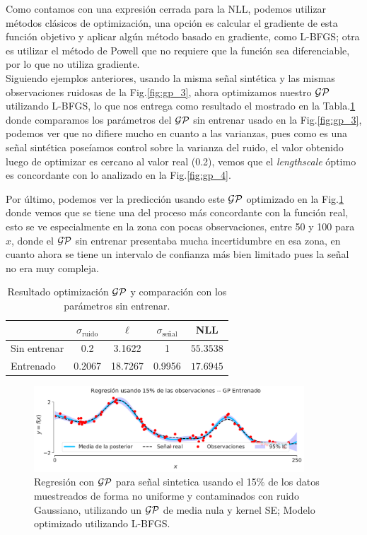 
Como contamos con una expresión cerrada para la NLL, podemos utilizar métodos clásicos de optimización, una opción es calcular el gradiente de esta función objetivo y aplicar algún método basado en gradiente, como L-BFGS; otra es utilizar el método de Powell que no requiere que la función sea diferenciable, por lo que no utiliza gradiente.\\


Siguiendo ejemplos anteriores, usando la misma señal sintética y las mismas observaciones ruidosas de la Fig.\ref{fig:gp_3}, ahora optimizamos nuestro $\mathcal{GP}$ utilizando L-BFGS, lo que nos entrega como resultado el mostrado en la Tabla.\ref{tab:gp_1} donde comparamos los parámetros del $\mathcal{GP}$ sin entrenar usado en la Fig.\ref{fig:gp_3}, podemos ver que no difiere mucho en cuanto a las varianzas, pues como es una señal sintética poseíamos control sobre la varianza del ruido, el valor obtenido luego de optimizar es cercano al valor real (0.2), vemos que el \textit{lengthscale} óptimo es concordante con lo analizado en la Fig.\ref{fig:gp_4}.

Por último, podemos ver la predicción usando este $\mathcal{GP}$ optimizado en la Fig.\ref{fig:gp_5} donde vemos que se tiene una del proceso más concordante con la función real, esto se ve especialmente en la zona con pocas observaciones, entre 50 y 100 para $x$, donde el $\mathcal{GP}$ sin entrenar presentaba mucha incertidumbre en esa zona, en cuanto ahora se tiene un intervalo de confianza más bien limitado pues la señal no era muy compleja.

\begin{table}[H]
\centering
\begin{tabular}{lcccc}
 & $\sigma_{\text{ruido}}$ & $\ell$ & $\sigma_{\text{señal}}$ & NLL\\ \hline
Sin entrenar & 0.2 & 3.1622 & 1 & $\mathbf{55.3538}$\\
Entrenado & 0.2067 & 18.7267 & 0.9956 & $\mathbf{17.6945}$\\
\end{tabular}
\caption{Resultado optimización $\mathcal{GP}$ y comparación con los parámetros sin entrenar.}
\label{tab:gp_1}
\end{table}


\begin{figure}[H]
	\centering
	\includegraphics[width=0.9\textwidth]{img/cap6_gp_entrenado}
	\caption{Regresión con $\mathcal{GP}$ para señal sintetica usando el 15$\%$ de los datos muestreados de forma no uniforme y contaminados con ruido Gaussiano, utilizando un $\mathcal{GP}$ de media nula y kernel SE; Modelo optimizado utilizando L-BFGS.}
	\label{fig:gp_5}
\end{figure}

